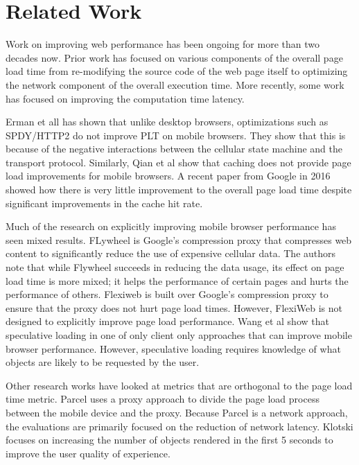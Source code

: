 \section{Related Work}
\label{sec:related}

Work on improving web performance has been ongoing for more than two decades now. 
Prior work has focused on various components of the overall page load time
from re-modifying the source code of the web page itself to optimizing the
network component of the overall execution time. More recently, some work
has focused on improving the computation time latency. 

Erman et all \cite{erman2013conext} %
has shown that unlike desktop browsers, optimizations such as SPDY/HTTP2 do not improve
PLT on mobile browsers. They show that this is because of the negative interactions
between the cellular state machine and the transport protocol. Similarly, Qian
et al \cite{quian2012mobisys} %
show that caching does not provide
page load improvements for mobile browsers. 
A recent paper from Google in 2016 \cite{vesuna2016caching} %
showed how there is very little improvement to the overall page load time despite 
significant improvements in the cache hit rate. 

Much of the research on explicitly improving mobile browser performance has seen mixed results.
FLywheel \cite{agababov2015nsdi} is Google's compression proxy that compresses web content to significantly 
reduce the use of expensive cellular data. The authors note that while Flywheel succeeds in
reducing the data usage, its effect on page load time is more mixed; it helps
the performance of certain pages and hurts the performance of others. Flexiweb \cite{singh2015mobicom} is built over
Google's compression proxy to ensure that the proxy does not hurt page load times. However, FlexiWeb
is not designed to explicitly improve page load performance. Wang et al \cite{wang2013demystifying} show that
speculative loading in one of only client only approaches that can improve mobile
browser performance. However, speculative loading requires knowledge of what objects are likely
to be requested by the user. 

Other research works have looked at metrics that are orthogonal to the page load time metric. Parcel
\cite{sivakumar2014conext} %
 uses a proxy
approach to divide the page load process between the mobile device and the proxy. Because Parcel is
a network approach, the evaluations are primarily focused on the reduction of network
latency. Klotski \cite{butkiewicz2015usenix} focuses on increasing the number of objects rendered in the first
5 seconds to improve the user quality of experience. 

